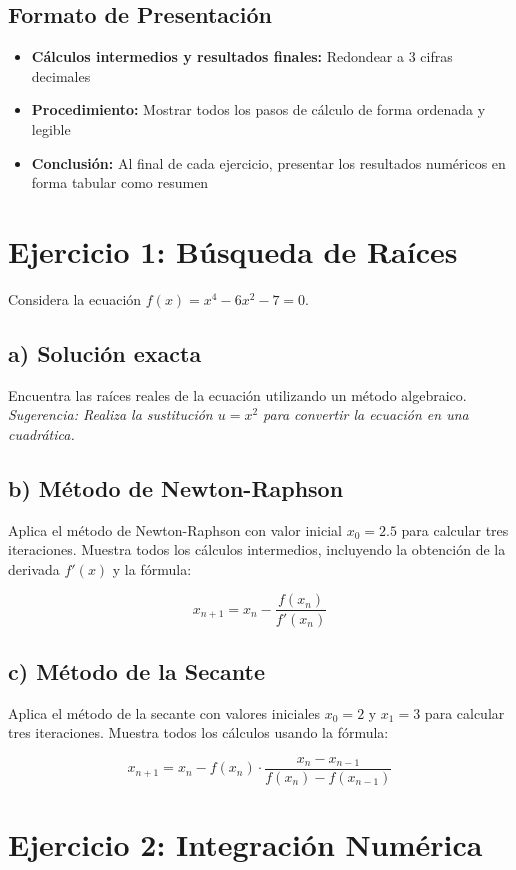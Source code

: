 \documentclass[12pt,a4paper]{article}
\begin{document}
\subsection*{Formato de Presentación}
\begin{itemize}
\item \textbf{Cálculos intermedios y resultados finales:} Redondear a 3 cifras decimales
\item \textbf{Procedimiento:} Mostrar todos los pasos de cálculo de forma ordenada y legible
\item \textbf{Conclusión:} Al final de cada ejercicio, presentar los resultados numéricos en forma tabular como resumen
\end{itemize}

\section*{Ejercicio 1: Búsqueda de Raíces}

Considera la ecuación \(f(x) = x^4 - 6x^2 - 7 = 0\).

\subsection*{a) Solución exacta}
Encuentra las raíces reales de la ecuación utilizando un método algebraico. \textit{Sugerencia: Realiza la sustitución \(u = x^2\) para convertir la ecuación en una cuadrática.}

\subsection*{b) Método de Newton-Raphson}
Aplica el método de Newton-Raphson con valor inicial \(x_0 = 2.5\) para calcular tres iteraciones. Muestra todos los cálculos intermedios, incluyendo la obtención de la derivada \(f'(x)\) y la fórmula:

\[x_{n+1} = x_n - \frac{f(x_n)}{f'(x_n)}\]

\subsection*{c) Método de la Secante}
Aplica el método de la secante con valores iniciales \(x_0 = 2\) y \(x_1 = 3\) para calcular tres iteraciones. Muestra todos los cálculos usando la fórmula:

\[x_{n+1} = x_n - f(x_n) \cdot \frac{x_n - x_{n-1}}{f(x_n) - f(x_{n-1})}\]

\section*{Ejercicio 2: Integración Numérica}
\end{document}
